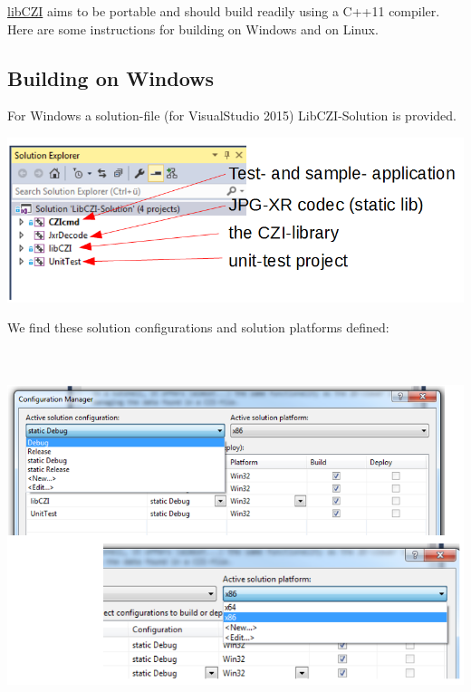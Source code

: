 \hyperlink{namespacelib_c_z_i}{lib\+C\+ZI} aims to be portable and should build readily using a C++11 compiler. Here are some instructions for building on Windows and on Linux.

\subsection*{Building on Windows }

For Windows a solution-\/file (for Visual\+Studio 2015) {\ttfamily Lib\+C\+Z\+I-\/\+Solution} is provided.


\begin{DoxyImage}
\includegraphics[width=\textwidth,height=\textheight/2,keepaspectratio=true]{VisualStudioProj_1.PNG}
\end{DoxyImage}
 We find these solution configurations and solution platforms defined\+:


\begin{DoxyImage}
\includegraphics[height=10.8cm]{VisualStudioProj_2.PNG}
\end{DoxyImage}


